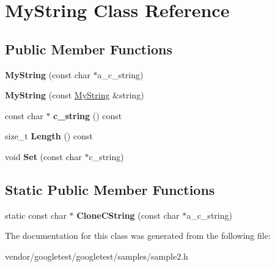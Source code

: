 \hypertarget{classMyString}{}\section{My\+String Class Reference}
\label{classMyString}
\subsection*{Public Member Functions}
\begin{DoxyCompactItemize}
\item 
{\bfseries My\+String} (const char $\ast$a\+\_\+c\+\_\+string)\hypertarget{classMyString_a28134eb91b6698f46b12accefa157d0f}{}\label{classMyString_a28134eb91b6698f46b12accefa157d0f}

\item 
{\bfseries My\+String} (const \hyperlink{classMyString}{My\+String} \&string)\hypertarget{classMyString_ae24c7cf89a58dd2287303df2ac054c66}{}\label{classMyString_ae24c7cf89a58dd2287303df2ac054c66}

\item 
const char $\ast$ {\bfseries c\+\_\+string} () const \hypertarget{classMyString_a0089588935fc8235124f58f514cb07a1}{}\label{classMyString_a0089588935fc8235124f58f514cb07a1}

\item 
size\+\_\+t {\bfseries Length} () const \hypertarget{classMyString_a878f7e0a327814729a04a412d7b95801}{}\label{classMyString_a878f7e0a327814729a04a412d7b95801}

\item 
void {\bfseries Set} (const char $\ast$c\+\_\+string)\hypertarget{classMyString_a521c4cd7eccac6ce554d8a51505e4970}{}\label{classMyString_a521c4cd7eccac6ce554d8a51505e4970}

\end{DoxyCompactItemize}
\subsection*{Static Public Member Functions}
\begin{DoxyCompactItemize}
\item 
static const char $\ast$ {\bfseries Clone\+C\+String} (const char $\ast$a\+\_\+c\+\_\+string)\hypertarget{classMyString_a3acde3db40f8e70bad239739a5466275}{}\label{classMyString_a3acde3db40f8e70bad239739a5466275}

\end{DoxyCompactItemize}


The documentation for this class was generated from the following file\+:\begin{DoxyCompactItemize}
\item 
vendor/googletest/googletest/samples/sample2.\+h\end{DoxyCompactItemize}
